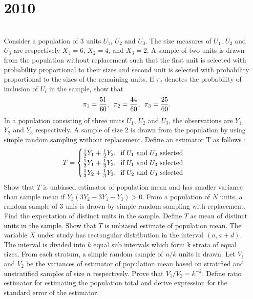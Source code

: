 \newpage
\section*{2010}
\vspace{-.5cm}
\hrulefill \smallskip\\
 Consider a population of 3 units $U_1$, $U_2$ and $U_3$. The size measures of $U_1$, $U_2$ and $U_3$ are respectively $X_1 = 6$, $X_2=4$, and $X_3 = 2$. A sample of two units is drawn from the population without replacement such that the first unit is selected with probability proportional to their sizes and second unit is selected with probability proportional to the sizes of the remaining units. If $\pi_i$ denotes the probability of inclusion of $U_i$ in the sample, show that
\[ \pi_1 = \frac{51}{60}, \enskip \pi_2 = \frac{44}{60}, \enskip\pi_3 = \frac{25}{60}.\]
 In a population consisting of three units $U_1$, $U_2$ and $U_3$, the observations are $Y_1$, $Y_2$ and $Y_3$ respectively. A sample of size 2 is drawn from the population by using simple random sampling without replacement. Define an estimator T as follows :
\[ T = \begin{cases} \frac{1}{2}Y_1 + \frac{1}{2}Y_2, \enskip \text{if } U_1 \text{ and } U_2 \text{ selected} \\
\frac{1}{2}Y_1 + \frac{1}{3}Y_3, \enskip \text{if } U_1 \text{ and } U_3 \text{ selected} \\
\frac{1}{2}Y_2 + \frac{1}{3}Y_3, \enskip \text{if } U_2 \text{ and } U_3 \text{ selected}
\end{cases}
\] Show that $T$ is unbiased estimator of population mean and has smaller variance than sample mean if $Y_3(3Y_2 - 3Y_1 - Y_3) > 0$.
\myline
{} From a population of $N$ units, a random sample of 3 unis is drawn by simple random sampling with replacement. Find the expectation of distinct units in the sample. Define $T$ as mean of distinct units in the sample. Show that $T$ is unbiased estimate of population mean.
\myline
{} The variable $X$ under study has rectangular distribution in the interval $(a, a+d)$. The interval is divided into $k$ equal sub intervals which form k strata of equal sizes. From each stratum, a simple random sample of $n/k$ units is drawn. Let $V_1$ and $V_2$ be the variances of estimator of population mean based on stratified and unstratified samples of size $n$ respectively. Prove that $V_1/V_2 = k^{-2}$.
\myline
{} Define ratio estimator for estimating the population total and derive expression for the standard error of the estimator.